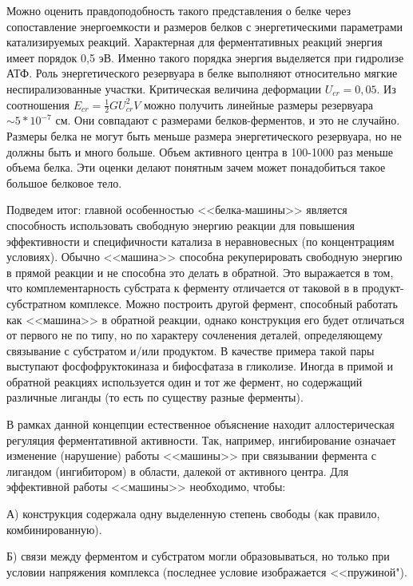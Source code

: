 \documentclass[12pt,a4paper,oneside]{book}
\begin{document}

Можно оценить правдоподобность такого представления о белке через сопоставление энергоемкости и размеров белков с энергетическими параметрами катализируемых реакций. 
Характерная для ферментативных реакций энергия имеет порядок 0,5 эВ. Именно такого порядка энергия выделяется при гидролизе АТФ. Роль энергетического резервуара в белке выполняют относительно мягкие неспирализованные участки. Критическая величина деформации $ U_{cr} = 0,05 $. Из соотношения $E_{cr}=\frac{1}{2} G U_{cr}^2 V $ можно получить линейные размеры резервуара $ \sim 5*10^{-7} $ см. Они совпадают с размерами белков-ферментов, и это не случайно. Размеры белка не могут быть меньше размера энергетического резервуара, но не должны быть и много больше. Объем активного центра в 100-1000 раз меньше объема белка. Эти оценки делают понятным зачем может понадобиться такое большое белковое тело.

Подведем итог: главной особенностью <<белка-машины>> является способность использовать свободную энергию реакции для повышения эффективности и специфичности катализа в неравновесных (по концентрациям условиях).
Обычно <<машина>> способна рекуперировать свободную энергию в прямой реакции и не способна это делать в обратной. Это выражается  в том, что комплементарность субстрата к ферменту отличается от таковой в в продукт-субстратном комплексе. Можно построить другой фермент, способный работать как <<машина>> в обратной реакции, однако конструкция его будет отличаться от первого не по типу, но по характеру сочленения деталей, определяющему связывание с субстратом и/или продуктом. В качестве примера такой пары выступают фосфофруктокиназа и бифосфатаза в гликолизе. Иногда в примой и обратной реакциях используется один и тот же фермент, но содержащий различные лиганды (то есть по существу разные ферменты).  

В рамках данной концепции естественное объяснение находит аллостерическая регуляция ферментативной активности. Так, например, ингибирование означает изменение (нарушение) работы <<машины>> при связывании фермента с лигандом (ингибитором) в области, далекой от активного центра. 
Для эффективной работы <<машины>> необходимо, чтобы:

А) конструкция содержала одну выделенную степень свободы (как правило, комбинированную).

Б) связи между ферментом и субстратом могли образовываться, но только при условии напряжения комплекса (последнее условие изображается <<пружиной").
\end{document}
